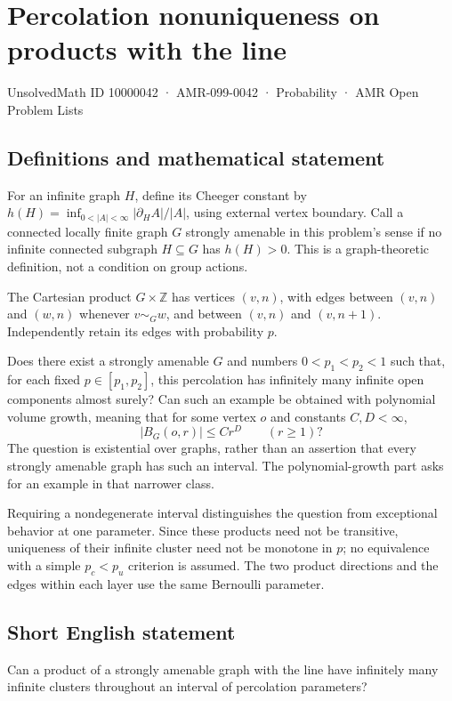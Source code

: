 \documentclass[11pt,a4paper]{article}
\begin{document}
\section*{Percolation nonuniqueness on products with the line}\label{10000042}
{\small UnsolvedMath ID 10000042 · AMR-099-0042 · Probability · AMR Open Problem Lists}
\subsection{Definitions and mathematical statement}
For an infinite graph $H$, define its Cheeger constant by $h(H)=\inf_{0<|A|<\infty}|\partial_H A|/|A|$, using external vertex boundary. Call a connected locally finite graph $G$ strongly amenable in this problem's sense if no infinite connected subgraph $H\subseteq G$ has $h(H)>0$. This is a graph-theoretic definition, not a condition on group actions.

The Cartesian product $G\times\mathbb Z$ has vertices $(v,n)$, with edges between $(v,n)$ and $(w,n)$ whenever $v\sim_Gw$, and between $(v,n)$ and $(v,n+1)$. Independently retain its edges with probability $p$.

Does there exist a strongly amenable $G$ and numbers $0<p_1<p_2<1$ such that, for each fixed $p\in[p_1,p_2]$, this percolation has infinitely many infinite open components almost surely? Can such an example be obtained with polynomial volume growth, meaning that for some vertex $o$ and constants $C,D<\infty$,
\[
|B_G(o,r)|\le Cr^D\qquad(r\ge1)?
\]
The question is existential over graphs, rather than an assertion that every strongly amenable graph has such an interval. The polynomial-growth part asks for an example in that narrower class.

Requiring a nondegenerate interval distinguishes the question from exceptional behavior at one parameter. Since these products need not be transitive, uniqueness of their infinite cluster need not be monotone in $p$; no equivalence with a simple $p_c<p_u$ criterion is assumed. The two product directions and the edges within each layer use the same Bernoulli parameter.
\subsection{Short English statement}
Can a product of a strongly amenable graph with the line have infinitely many infinite clusters throughout an interval of percolation parameters?
\end{document}
